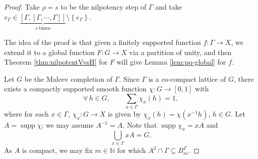 \documentclass[11pt,reqno]{amsart}
\newcommand{\1}{\mathbf 1}
\begin{document}
\begin{proof}
Take $\rho=s$ to be the nilpotency step of $\Gamma$ and take $v_\Gamma \in \underbrace{\left[\Gamma,\left[\Gamma,\cdots,\Gamma\right]\right]}_{s\mathrm{~times}}\setminus\left\{e_{\Gamma}\right\}$. 

The idea of the proof is that given a finitely supported function $f:\Gamma\to X$, we extend it to a global function $F:G\to X$ via a partition of unity, and then Theorem \ref{thm:nilpotentVvsH} for $F$ will give Lemma \ref{lem:pq-global} for $f$.

Let $G$ be the Malcev completion of $\Gamma$. Since $\Gamma$ is a co-compact lattice of $G$, there exists a compactly supported smooth function $\chi:G\to \left[0,1\right]$ with
\begin{equation}\label{eq:partition of unity}
\forall\, h\in G,\qquad \sum_{x\in \Gamma} \chi_x\left(h\right)=1,
\end{equation}
where for each $x\in \Gamma$, $\chi_x:G\to X$ is given by $\chi_x\left(h\right)=\chi\left(x^{-1}h\right)$, $h\in G$. Let $A=\operatorname{supp}\chi$; we may assume $A^{-1}=A$. Note that $\operatorname{supp}\chi_x=xA$ and
\[
\bigcup_{x\in \Gamma}xA=G.
\]
As $A$ is compact, we may fix $m\in \mathbb{N}$ for which $A^2\cap \Gamma\subseteq B^\Gamma_m$.


\end{proof}
\end{document}
